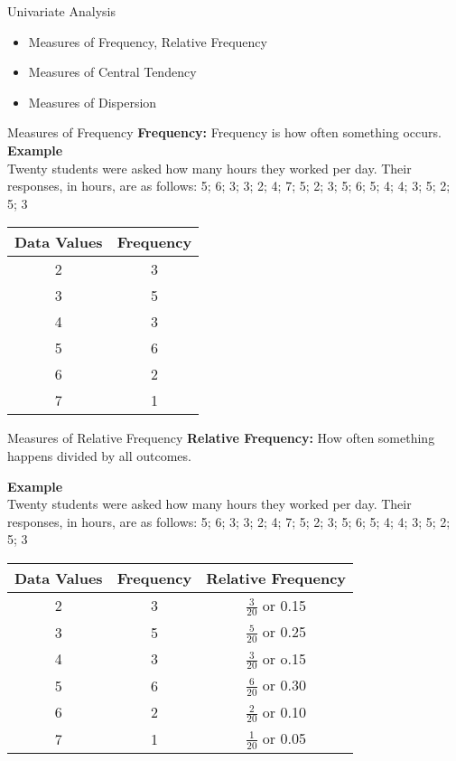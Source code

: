 \begin{frame}[t]{Univariate Analysis}
	\begin{itemize}
		\item Measures of Frequency, Relative Frequency 
		\item Measures of Central Tendency
		\item Measures of Dispersion
	\end{itemize}
\end{frame}
\begin{frame}[t]{Measures of Frequency}
	\textbf{Frequency:} Frequency is how often something occurs. \\ 
	\textbf{Example} \\ 
	Twenty students were asked how many hours they worked per day.
	Their responses, in hours,
	are as follows: 5; 6; 3; 3; 2; 4; 7; 5; 2; 3; 5; 6; 5; 4; 4; 3; 5; 2; 
	5; 3
	\begin{center}
		\begin{tabular}{|c|c|} 
			\hline 
			Data Values & Frequency \\ 
			\hline 
			2 & 3 \\ 
			\hline 
			3 & 5 \\
			\hline  
			4 & 3 \\
			\hline  
			5 & 6 \\
			\hline  
			6 & 2 \\
			\hline 
			7 & 1 \\
			\hline 
		\end{tabular}
	\end{center}
\end{frame}

\begin{frame}[t]{Measures of Relative Frequency}
\textbf{Relative Frequency:} How often something happens divided by all 
outcomes.

	\textbf{Example} \\ 
	Twenty students were asked how many hours they worked per day.
	Their responses, in hours,
	are as follows: 5; 6; 3; 3; 2; 4; 7; 5; 2; 3; 5; 6; 5; 4; 4; 3; 5; 2; 
	5; 3
	\begin{center}
		\begin{tabular}{|c|c|c|} 
			\hline 
			Data Values & Frequency & Relative Frequency \\ 
			\hline 
			2 & 3 & $\frac{3}{20}$ or 0.15 \\ 
			\hline 
			3 & 5 &  $\frac{5}{20}$ or 0.25\\
			\hline  
			4 & 3 &  $\frac{3}{20}$ or o.15\\
			\hline  
			5 & 6 &  $\frac{6}{20}$ or 0.30\\
			\hline  
			6 & 2 &  $\frac{2}{20}$ or 0.10 \\
			\hline 
			7 & 1 &  $\frac{1}{20}$ or 0.05\\
			\hline 
		\end{tabular}
	\end{center}
\end{frame}
